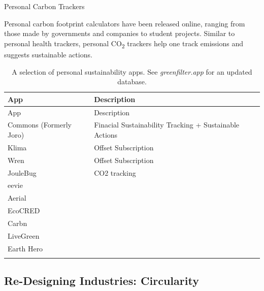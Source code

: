 \documentclass[
  letterpaper,
  DIV=11,
  numbers=noendperiod]{scrartcl}
\begin{document}
Personal Carbon Trackers

Personal carbon footprint calculators have been released online, ranging
from those made by governments and companies to student projects.
Similar to personal health trackers, personal CO\textsubscript{2}
trackers help one track emissions and suggests sustainable actions.

\begin{longtable}[]{@{}
  >{\raggedright\arraybackslash}p{}
  >{\raggedright\arraybackslash}p{}@{}}
\caption{A selection of personal sustainability apps. See
\emph{greenfilter.app} for an updated database.}\tabularnewline
\toprule\noalign{}
\begin{minipage}[b]{\linewidth}\raggedright
App
\end{minipage} & \begin{minipage}[b]{\linewidth}\raggedright
Description
\end{minipage} \\
\midrule\noalign{}
\endfirsthead
\toprule\noalign{}
\begin{minipage}[b]{\linewidth}\raggedright
App
\end{minipage} & \begin{minipage}[b]{\linewidth}\raggedright
Description
\end{minipage} \\
\midrule\noalign{}
\endhead
\bottomrule\noalign{}
\endlastfoot
Commons (Formerly Joro) & Finacial Sustainability Tracking + Sustainable
Actions \\
Klima & Offset Subscription \\
Wren & Offset Subscription \\
JouleBug & CO2 tracking \\
eevie & \\
Aerial & \\
EcoCRED & \\
Carbn & \\
LiveGreen & \\
Earth Hero & \\
& \\
\end{longtable}

\subsection{Re-Designing Industries:
Circularity}\label{re-designing-industries-circularity}
\end{document}
